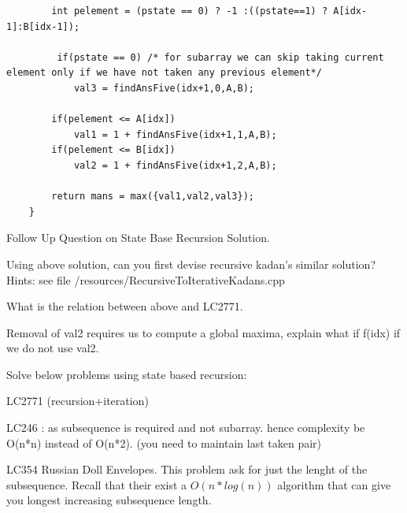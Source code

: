 \begin{solution}
\begin{minipage}{\textwidth}
\begin{lstlisting}
        int pelement = (pstate == 0) ? -1 :((pstate==1) ? A[idx-1]:B[idx-1]);
        
         if(pstate == 0) /* for subarray we can skip taking current element only if we have not taken any previous element*/
            val3 = findAnsFive(idx+1,0,A,B);
        
        if(pelement <= A[idx])
            val1 = 1 + findAnsFive(idx+1,1,A,B);
        if(pelement <= B[idx])
            val2 = 1 + findAnsFive(idx+1,2,A,B);
        
        return mans = max({val1,val2,val3});
    }
\end{lstlisting}
\end{minipage}
\end{solution}

\begin{solution}
    Follow Up Question on State Base Recursion Solution.
    \begin{asparaenum}[(a)]
        \item Using above solution, can you first devise recursive kadan's similar solution? 
        Hints: see file /resources/RecursiveToIterativeKadans.cpp
        \item What is the relation between above and LC2771.
        \item Removal of val2 requires us to compute a global maxima, explain what if f(idx) if we do not use val2.
        \item Solve below problems using state based recursion:
        \item LC2771 (recursion+iteration)
        \item LC246 : as subsequence is required and not subarray. hence complexity be O(n*n) instead of O(n*2). (you need to maintain last taken pair)
        \item LC354 Russian Doll Envelopes. This problem ask for just the lenght of the subsequence. Recall that their exist a $O(n*log(n))$ algorithm that can give you longest increasing subsequence length.
    \end{asparaenum}  
\end{solution}


